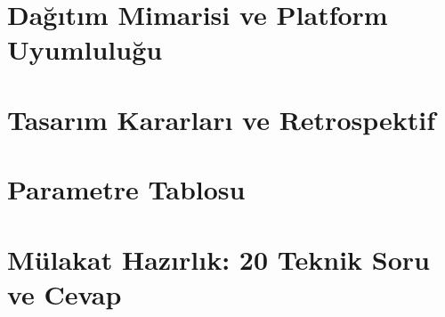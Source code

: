 \documentclass[12pt,a4paper,oneside]{book}
\theoremstyle{definition}
\begin{document}



\chapter{Da\u{g}{\i}t{\i}m Mimarisi ve Platform Uyumlulu\u{g}u}
\label{chap:dagitim}




\chapter{Tasar{\i}m Kararlar{\i} ve Retrospektif}
\label{chap:retrospektif}




\appendix

\chapter{Parametre Tablosu}
\label{app:parametreler}




\chapter{M\"{u}lakat Haz{\i}rl{\i}k: 20 Teknik Soru ve Cevap}
\label{app:mulakat}


\end{document}

